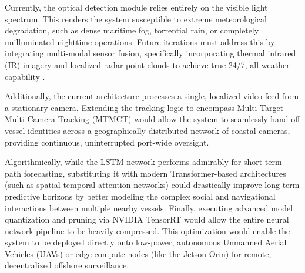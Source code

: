 Currently, the optical detection module relies entirely on the visible light spectrum. This renders the system susceptible to extreme meteorological degradation, such as dense maritime fog, torrential rain, or completely unilluminated nighttime operations. Future iterations must address this by integrating multi-modal sensor fusion, specifically incorporating thermal infrared (IR) imagery and localized radar point-clouds to achieve true 24/7, all-weather capability \citep{Ref26}. 

Additionally, the current architecture processes a single, localized video feed from a stationary camera. Extending the tracking logic to encompass Multi-Target Multi-Camera Tracking (MTMCT) would allow the system to seamlessly hand off vessel identities across a geographically distributed network of coastal cameras, providing continuous, uninterrupted port-wide oversight. 

Algorithmically, while the LSTM network performs admirably for short-term path forecasting, substituting it with modern Transformer-based architectures (such as spatial-temporal attention networks) could drastically improve long-term predictive horizons by better modeling the complex social and navigational interactions between multiple nearby vessels. Finally, executing advanced model quantization and pruning via NVIDIA TensorRT would allow the entire neural network pipeline to be heavily compressed. This optimization would enable the system to be deployed directly onto low-power, autonomous Unmanned Aerial Vehicles (UAVs) or edge-compute nodes (like the Jetson Orin) for remote, decentralized offshore surveillance.


